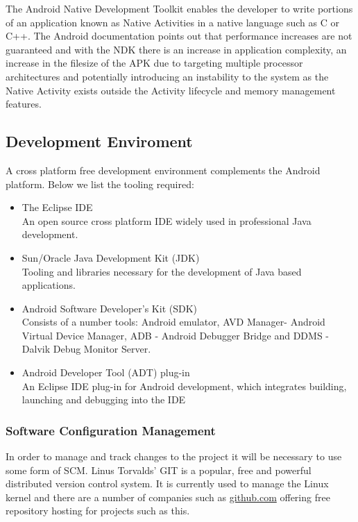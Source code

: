 The Android Native Development Toolkit enables the developer to write portions of an application known as Native Activities in a native language such as C or C++. The Android documentation points out that performance increases are not guaranteed and with the NDK there is an increase in application complexity, an increase in the filesize of the APK due to targeting multiple processor architectures and potentially introducing an instability to the system as the Native Activity exists outside the Activity lifecycle and memory management features.

\subsection{Development Enviroment}

A cross platform free development environment complements the Android platform.  Below we list the tooling required:

\begin{itemize}
\item The Eclipse IDE\\
An open source cross platform IDE widely used in professional Java development.
\item Sun/Oracle Java Development Kit (JDK)\\
Tooling and libraries necessary for the development of Java based applications.
\item Android Software Developer's Kit (SDK)\\
Consists of a number tools: Android emulator, AVD Manager- Android Virtual Device Manager, ADB - Android Debugger Bridge and DDMS - Dalvik Debug Monitor Server.
\item Android Developer Tool (ADT) plug-in\\
An Eclipse IDE plug-in for Android development, which integrates building, launching and debugging into the IDE
\end{itemize}

\subsubsection{Software Configuration Management}
In order to manage and track changes to the project it will be necessary to use some form of SCM. Linus Torvalds' GIT is a popular, free and powerful distributed version control system. It is currently used to manage the Linux kernel and there are a number of companies such as \url{github.com} offering free repository hosting for projects such as this.

